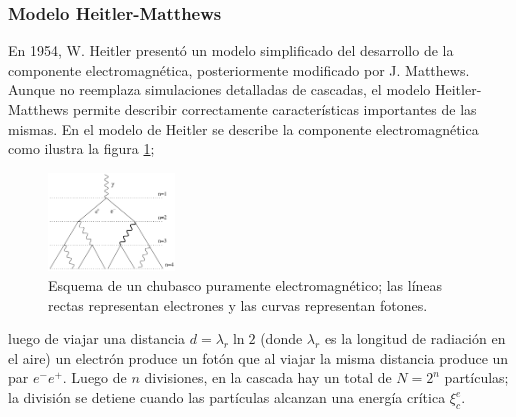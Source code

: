 		\subsubsection*{Modelo Heitler-Matthews}
		En 1954, W. Heitler presentó un modelo simplificado del desarrollo de la componente electromagnética, posteriormente modificado por J. Matthews. Aunque no reemplaza simulaciones detalladas de cascadas, el modelo Heitler-Matthews permite describir correctamente características importantes de las mismas. En el modelo de Heitler se describe la componente electromagnética como ilustra la figura \ref{fig:heitler_em}; 
		\begin{figure}
		\includegraphics[width=0.3\textwidth]{Figuras/heitler_em.png} 
		\caption{Esquema de un chubasco puramente electromagnético; las líneas rectas representan electrones y las curvas representan fotones.}
		\label{fig:heitler_em}
		\end{figure}		
		luego de viajar una distancia $d=\lambda_r \ln 2$ (donde $\lambda_r$ es la longitud de radiación en el aire) un electrón produce un fotón que al viajar la misma distancia produce un par $e^- e^+$. Luego de $n$ divisiones, en la cascada hay un total de $N=2^n$ partículas; la división se detiene cuando las partículas alcanzan una energía crítica $\xi^e_c$. \\
		

